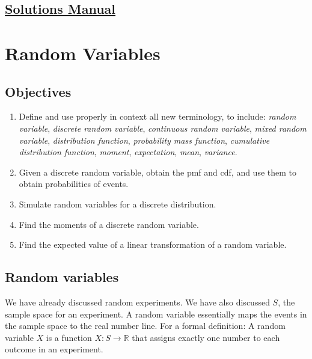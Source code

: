 \documentclass[
  letterpaper,
  DIV=11,
  numbers=noendperiod]{scrreprt}
\begin{document}
\section*{\texorpdfstring{\href{https://ds-usafa.github.io/CPS-Solutions-Manual/CONDPROB.html}{Solutions
Manual}}{Solutions Manual}}\label{solutions-manual-9}


\chapter{Random Variables}\label{RANDVAR}

\section{Objectives}\label{objectives-10}

\begin{enumerate}
\def\labelenumi{\arabic{enumi})}
\item
  Define and use properly in context all new terminology, to include:
  \emph{random variable}, \emph{discrete random variable},
  \emph{continuous random variable}, \emph{mixed random variable},
  \emph{distribution function}, \emph{probability mass function},
  \emph{cumulative distribution function}, \emph{moment},
  \emph{expectation}, \emph{mean}, \emph{variance}.
\item
  Given a discrete random variable, obtain the pmf and cdf, and use them
  to obtain probabilities of events.
\item
  Simulate random variables for a discrete distribution.
\item
  Find the moments of a discrete random variable.
\item
  Find the expected value of a linear transformation of a random
  variable.
\end{enumerate}

\section{Random variables}\label{random-variables-1}

We have already discussed random experiments. We have also discussed
\(S\), the sample space for an experiment. A random variable essentially
maps the events in the sample space to the real number line. For a
formal definition: A random variable \(X\) is a function
\(X: S\rightarrow \mathbb{R}\) that assigns exactly one number to each
outcome in an experiment.
\end{document}
